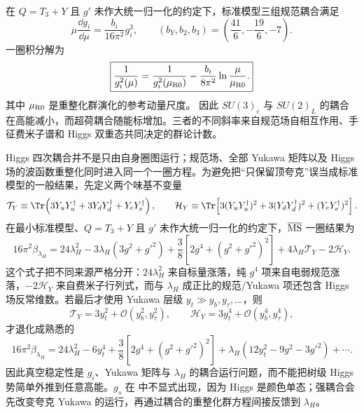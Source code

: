 在 $Q=T_3+Y$ 且 $g'$ 未作大统一归一化的约定下，标准模型三组规范耦合满足
\begin{equation}
\boxed{
\mu\frac{\dd g_i}{\dd\mu}
=\frac{b_i}{16\pi^2}g_i^3,
\qquad
(b_Y,b_2,b_3)=\left(\frac{41}{6},-\frac{19}{6},-7\right).}
\label{eq:sm-gauge-beta-one-loop-dp11}
\end{equation}
一圈积分解为
\begin{equation}
\boxed{
\frac1{g_i^2(\mu)}
=\frac1{g_i^2(\mu_{\rm R0})}
-\frac{b_i}{8\pi^2}\ln\frac\mu{\mu_{\rm R0}}.}
\label{eq:sm-gauge-running-dp11}
\end{equation}
其中 $\mu_{\rm R0}$ 是重整化群演化的参考动量尺度。
因此 $SU(3)_c$ 与 $SU(2)_L$ 的耦合在高能减小，而超荷耦合随能标增加。三者的不同斜率来自规范场自相互作用、手征费米子谱和 Higgs 双重态共同决定的群论计数。

Higgs 四次耦合并不是只由自身圈图运行；规范场、全部 Yukawa 矩阵以及 Higgs 场的波函数重整化同时进入同一个一圈方程。为避免把“只保留顶夸克”误当成标准模型的一般结果，先定义两个味基不变量
\begin{equation*}
 \mathcal T_Y\equiv
 \Tr\!\left(3Y_uY_u^\dagger+3Y_dY_d^\dagger+Y_eY_e^\dagger\right),
 \qquad
 \mathcal H_Y\equiv
 \Tr\!\left[3(Y_uY_u^\dagger)^2+3(Y_dY_d^\dagger)^2+(Y_eY_e^\dagger)^2\right].
\end{equation*}
在最小标准模型、$Q=T_3+Y$ 且 $g'$ 未作大统一归一化的约定下，$\overline{\rm MS}$ 一圈结果为
\begin{equation}
\boxed{
16\pi^2\beta_{\lambda_H}
=24\lambda_H^2
-3\lambda_H(3g^2+g'^2)
+\frac38\!\left[2g^4+(g^2+g'^2)^2\right]
+4\lambda_H\mathcal T_Y-2\mathcal H_Y.}
\label{eq:sm-higgs-quartic-beta-dp93}
\end{equation}
这个式子把不同来源严格分开：$24\lambda_H^2$ 来自标量涨落，纯 $g^4$ 项来自电弱规范涨落，$-2\mathcal H_Y$ 来自费米子行列式，而与 $\lambda_H$ 成正比的规范/Yukawa 项还包含 Higgs 场反常维数。若最后才使用 Yukawa 层级 $y_t\gg y_b,y_\tau,\ldots$，则
\begin{equation*}
 \mathcal T_Y=3y_t^2+\mathcal O(y_b^2,y_\tau^2),
 \qquad
 \mathcal H_Y=3y_t^4+\mathcal O(y_b^4,y_\tau^4),
\end{equation*}
才退化成熟悉的
\begin{equation*}
16\pi^2\beta_{\lambda_H}
=24\lambda_H^2-6y_t^4
+\frac38\left[2g^4+(g^2+g'^2)^2\right]
+\lambda_H(12y_t^2-9g^2-3g'^2)+\cdots.
\end{equation*}
因此真空稳定性是 $g_i$、Yukawa 矩阵与 $\lambda_H$ 的耦合运行问题，而不能把树级 Higgs 势简单外推到任意高能。$g_s$ 在 中不显式出现，因为 Higgs 是颜色单态；强耦合会先改变夸克 Yukawa 的运行，再通过耦合的重整化群方程间接反馈到 $\lambda_H$。

